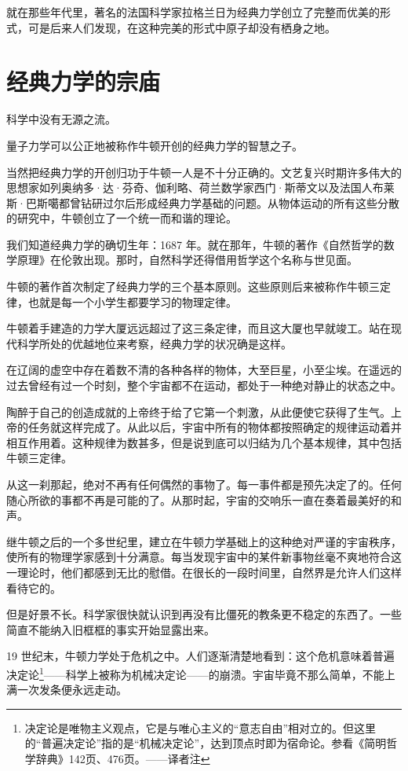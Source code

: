 就在那些年代里，著名的法国科学家拉格兰日为经典力学创立了完整而优美的形式，可是后来人们发现，在这种完美的形式中原子却没有栖身之地。

\section{经典力学的宗庙}

科学中没有无源之流。

量子力学可以公正地被称作牛顿开创的经典力学的智慧之子。

当然把经典力学的开创归功于牛顿一人是不十分正确的。文艺复兴时期许多伟大的思想家如列奥纳多·达·芬奇、伽利略、荷兰数学家西门·斯蒂文以及法国人布莱斯·巴斯噶都曾钻研过尔后形成经典力学基础的问题。从物体运动的所有这些分散的研究中，牛顿创立了一个统一而和谐的理论。

我们知道经典力学的确切生年：1687 年。就在那年，牛顿的著作《自然哲学的数学原理》在伦敦出现。那时，自然科学还得借用哲学这个名称与世见面。

牛顿的著作首次制定了经典力学的三个基本原则。这些原则后来被称作牛顿三定律，也就是每一个小学生都要学习的物理定律。

牛顿着手建造的力学大厦远远超过了这三条定律，而且这大厦也早就竣工。站在现代科学所处的优越地位来考察，经典力学的状况确是这样。

在辽阔的虚空中存在着数不清的各种各样的物体，大至巨星，小至尘埃。在遥远的过去曾经有过一个时刻，整个宇宙都不在运动，都处于一种绝对静止的状态之中。

陶醉于自己的创造成就的上帝终于给了它第一个刺激，从此便使它获得了生气。上帝的任务就这样完成了。从此以后，宇宙中所有的物体都按照确定的规律运动着并相互作用着。这种规律为数甚多，但是说到底可以归结为几个基本规律，其中包括牛顿三定律。

从这一刹那起，绝对不再有任何偶然的事物了。每一事件都是预先决定了的。任何随心所欲的事都不再是可能的了。从那时起，宇宙的交响乐一直在奏着最美好的和声。

继牛顿之后的一个多世纪里，建立在牛顿力学基础上的这种绝对严谨的宇宙秩序，使所有的物理学家感到十分满意。每当发现宇宙中的某件新事物丝毫不爽地符合这一理论时，他们都感到无比的慰借。在很长的一段时间里，自然界是允许人们这样看待它的。

但是好景不长。科学家很快就认识到再没有比僵死的教条更不稳定的东西了。一些简直不能纳入旧框框的事实开始显露出来。

19 世纪末，牛顿力学处于危机之中。人们逐渐清楚地看到：这个危机意味着普遍决定论\footnote{决定论是唯物主义观点，它是与唯心主义的“意志自由”相对立的。但这里的“普遍决定论”指的是“机械决定论”，达到顶点时即为宿命论。参看《简明哲学辞典》142页、476页。——译者注}——科学上被称为机械决定论——的崩溃。宇宙毕竟不那么简单，不能上满一次发条便永远走动。

